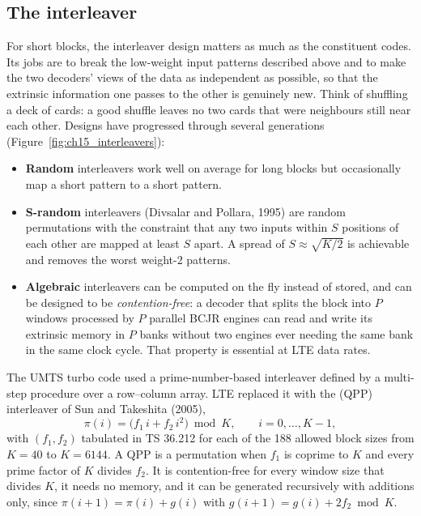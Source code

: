 \subsection{The interleaver}

For short blocks, the interleaver design matters as much as the constituent codes. Its jobs are to
break the low-weight input patterns described above and to make the two decoders' views of the
data as independent as possible, so that the extrinsic information one passes to the other is
genuinely new. Think of shuffling a deck of cards: a good shuffle leaves no two cards that were
neighbours still near each other. Designs have progressed through several generations
(Figure~\ref{fig:ch15_interleavers}):
\begin{itemize}
\item \textbf{Random} interleavers work well on average for long blocks but occasionally map a
short pattern to a short pattern.
\item \textbf{S-random} interleavers (Divsalar and Pollara, 1995) are random permutations with the
constraint that any two inputs within $S$ positions of each other are mapped at least $S$ apart. A
spread of $S\approx\sqrt{K/2}$ is achievable and removes the worst weight-2 patterns.
\item \textbf{Algebraic} interleavers can be computed on the fly instead of stored, and can be
designed to be \emph{contention-free}: a decoder that splits the block into $P$ windows processed by
$P$ parallel BCJR engines can read and write its extrinsic memory in $P$ banks without two engines
ever needing the same bank in the same clock cycle. That property is essential at LTE data rates.
\end{itemize}

The UMTS turbo code used a prime-number-based interleaver defined by a multi-step procedure over a
row--column array. LTE replaced it with the  (QPP)
interleaver of Sun and Takeshita (2005),
\begin{equation}
\pi(i)=\big(f_1\,i+f_2\,i^2\big)\bmod K,\qquad i=0,\dots,K-1,
\label{eq:ch15:qpp}
\end{equation}
with $(f_1,f_2)$ tabulated in TS 36.212 for each of the 188 allowed block sizes from $K=40$ to
$K=6144$. A QPP is a permutation when $f_1$ is coprime to $K$ and every prime factor of $K$ divides
$f_2$. It is contention-free for every window size that divides $K$, it needs no memory, and it can
be generated recursively with additions only, since
$\pi(i+1)=\pi(i)+g(i)$ with $g(i+1)=g(i)+2f_2 \bmod K$.

